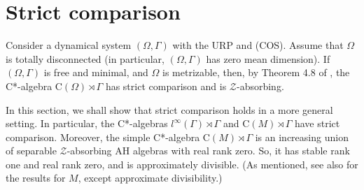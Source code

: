 \documentclass[12pt, oneside, psamsfonts]{amsart}
\newtheorem{cor}[thm]{Corollary}
\theoremstyle{definition}
\theoremstyle{remark}
\newtheorem{rem}[thm]{Remark}
\numberwithin{equation}{section}
\begin{document}


%
%
%


\section{Strict comparison}
Consider a dynamical system $(\Omega, \Gamma)$ with the URP and (COS). Assume that $\Omega$ is totally disconnected (in particular, $(\Omega, \Gamma)$ has zero mean dimension). If $(\Omega, \Gamma)$ is free and minimal, and $\Omega$ is metrizable, then, by Theorem 4.8 of  \cite{Niu-MD-Z}, the C*-algebra $\mathrm{C}(\Omega) \rtimes \Gamma$ has strict comparison and is $\mathcal Z$-absorbing.


In this section, we shall show that strict comparison holds in a more general setting. In particular, the C*-algebras $l^\infty(\Gamma) \rtimes \Gamma$ and $\mathrm{C}(M) \rtimes \Gamma$ have strict comparison. Moreover, the simple C*-algebra $\mathrm{C}(M) \rtimes \Gamma$ is an increasing union of separable $\mathcal Z$-absorbing AH algebras with real rank zero. So, it has stable rank one and real rank zero, and is approximately divisible. (As mentioned, see also \cite{Suzuki-sr1} for the results for $M$, except approximate divisibility.)
\end{document}
